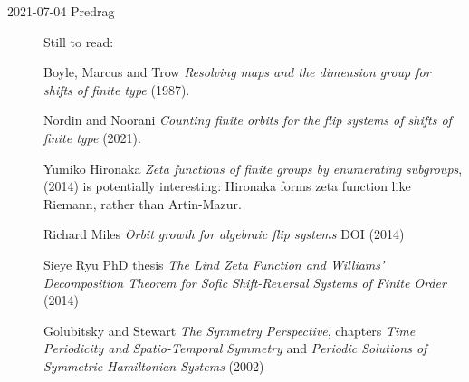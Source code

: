 \begin{description}
\item[2021-07-04 Predrag]
Still to read:

Boyle, Marcus and Trow
{\em Resolving maps and the dimension group for shifts of finite type}
(1987).

Nordin and Noorani
{\em Counting finite orbits for the flip systems of shifts of finite type}
(2021).

Yumiko Hironaka
{\em Zeta functions of finite groups by enumerating subgroups},
 (2014) is potentially interesting: Hironaka forms zeta
function like Riemann, rather than  Artin-Mazur.

Richard Miles
{\em Orbit growth for algebraic flip systems}
 {DOI} (2014)

Sieye Ryu
 {PhD thesis}
{{\em The Lind Zeta Function and Williams' Decomposition Theorem for Sofic
Shift-Reversal Systems of Finite Order}}
 (2014)

Golubitsky and Stewart
{{\em The Symmetry Perspective}},
chapters {\em Time Periodicity and Spatio-Temporal Symmetry}
and
{\em Periodic Solutions of Symmetric Hamiltonian Systems}
(2002)

\end{description}


%

%
%

\newpage


\Remarks

